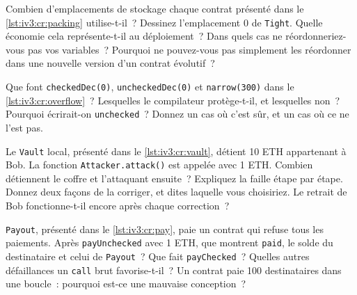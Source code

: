 \begin{question}\label{iq:iv3:smart-contracts-and-crypto-engineering:8}
Combien d'emplacements de stockage chaque contrat présenté dans le \cref{lst:iv3:cr:packing} utilise-t-il~? Dessinez l'emplacement 0 de \texttt{Tight}. Quelle économie cela représente-t-il au déploiement~? Dans quels cas ne réordonneriez-vous pas vos variables~? Pourquoi ne pouvez-vous pas simplement les réordonner dans une nouvelle version d'un contrat évolutif~?
\label{lst:iv3:cr:packing}
\end{question}

\begin{question}\label{iq:iv3:smart-contracts-and-crypto-engineering:9}
Que font \texttt{checkedDec(0)}, \texttt{uncheckedDec(0)} et \texttt{narrow(300)} dans le \cref{lst:iv3:cr:overflow}~? Lesquelles le compilateur protège-t-il, et lesquelles non~? Pourquoi écrirait-on \texttt{unchecked}~? Donnez un cas où c'est sûr, et un cas où ce ne l'est pas.
\label{lst:iv3:cr:overflow}
\end{question}

\begin{question}\label{iq:iv3:smart-contracts-and-crypto-engineering:10}
Le \texttt{Vault} local, présenté dans le \cref{lst:iv3:cr:vault}, détient 10 ETH appartenant à Bob. La fonction \texttt{Attacker.attack()} est appelée avec 1 ETH. Combien détiennent le coffre et l'attaquant ensuite~? Expliquez la faille étape par étape. Donnez deux façons de la corriger, et dites laquelle vous choisiriez. Le retrait de Bob fonctionne-t-il encore après chaque correction~?
\label{lst:iv3:cr:vault}
\end{question}

\begin{question}\label{iq:iv3:smart-contracts-and-crypto-engineering:11}
\texttt{Payout}, présenté dans le \cref{lst:iv3:cr:pay}, paie un contrat qui refuse tous les paiements. Après \texttt{payUnchecked} avec 1 ETH, que montrent \texttt{paid}, le solde du destinataire et celui de \texttt{Payout}~? Que fait \texttt{payChecked}~? Quelles autres défaillances un \texttt{call} brut favorise-t-il~? Un contrat paie 100 destinataires dans une boucle~: pourquoi est-ce une mauvaise conception~?
\label{lst:iv3:cr:pay}
\end{question}

